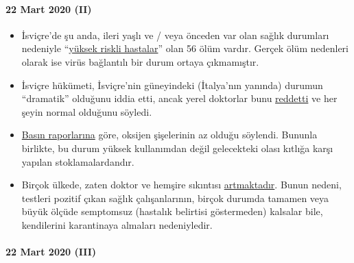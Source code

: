\hypertarget{22-mart-2020-ii}{%
\paragraph{22 Mart 2020 (II)}\label{22-mart-2020-ii}}

\begin{itemize}
\tightlist
\item
  İsviçre'de şu anda, ileri yaşlı ve / veya önceden var olan sağlık
  durumları nedeniyle
  ``\href{https://www.nzz.ch/schweiz/coronavirus-in-der-schweiz-die-neusten-entwicklungen-ld.1542664\#subtitle-wie-viele-infizierte-und-todesf-lle-gibt-es-second}{yüksek
  riskli hastalar}'' olan 56 ölüm vardır. Gerçek ölüm nedenleri olarak
  ise virüs bağlantılı bir durum ortaya çıkmamıştır.
\item
  İsviçre hükümeti, İsviçre'nin güneyindeki (İtalya'nın yanında) durumun
  ``dramatik'' olduğunu iddia etti, ancak yerel doktorlar bunu
  \href{https://www.nzz.ch/schweiz/punkto-intensivbetten-sind-wir-im-tessin-besser-ausgeruestet-als-der-rest-der-schweiz-ld.1547728}{reddetti}
  ve her şeyin normal olduğunu söyledi.
\item
  \href{https://www.blick.ch/news/schweiz/nicht-nur-beatmungsgeraete-werden-knapp-im-kampf-gegen-corona-es-droht-ein-engpass-beim-sauerstoff-id15808185.html}{Basın
  raporlarına} göre, oksijen şişelerinin az olduğu söylendi. Bununla
  birlikte, bu durum yüksek kullanımdan değil gelecekteki olası kıtlığa
  karşı yapılan stoklamalardandır.
\item
  Birçok ülkede, zaten doktor ve hemşire sıkıntısı
  \href{https://www.washingtonpost.com/health/covid-19-hits-doctors-nurses-emts-threatening-health-system/2020/03/17/f21147e8-67aa-11ea-b313-df458622c2cc_story.html}{artmaktadır}.
  Bunun nedeni, testleri pozitif çıkan sağlık çalışanlarının, birçok
  durumda tamamen veya büyük ölçüde semptomsuz (hastalık belirtisi
  göstermeden) kalsalar bile, kendilerini karantinaya almaları
  nedeniyledir.
\end{itemize}

\hypertarget{22-mart-2020-iii}{%
\paragraph{22 Mart 2020 (III)}\label{22-mart-2020-iii}}

